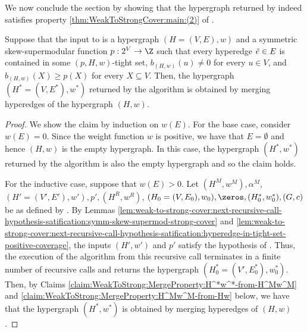 We now conclude the section by showing that the hypergraph returned by  indeed satisfies property \ref{thm:WeakToStrongCover:main:(2)} of .

\begin{lemma}\label{lem:weak-to-strong:correctness:main:hyperedge-merge}
    Suppose that the input to  is a hypergraph $(H = (V, E), w)$ and a symmetric skew-supermodular function $p:2^V\rightarrow \Z$ %
such that every hyperedge $\Tilde{e} \in E$ is contained in some $(p, H, w)$-tight set, $b_{(H,w)}(u) \not = 0$ for every $u \in V$, and $b_{(H,w)}(X) \geq p(X)$ for every $X \subseteq V$. 
    Then, the hypergraph $(H^* = (V, E^*), w^*)$ returned by the algorithm is obtained by merging hyperedges of the hypergraph $(H, w)$.
\end{lemma}
\begin{proof}
     We show the claim by induction on $w(E)$. For the base case, consider $w(E) = 0$. Since the weight function $w$ is positive, we have that $E = \emptyset$ and hence $(H, w)$ is the empty hypergraph. In this case, the hypergraph $(H^*, w^*)$ returned by the algorithm is also the empty hypergraph and so the claim holds. 

    For the inductive case, suppose that $w(E) > 0$. Let $(H^M, w^M), \alpha^M$, $(H' = (V', E'), w'), p',(H^R, w^R)$, $(H_0 = (V, E_0), w_0), \zeros, (H^*_0, w^*_0), (G, c)$ be as defined by . By Lemmas \ref{lem:weak-to-strong-cover:next-recursive-call-hypothesis-satification:symm-skew-supermod-strong-cover} and \ref{lem:weak-to-strong-cover:next-recursive-call-hypothesis-satification:hyperedge-in-tight-set-positive-coverage}, the inputs $(H',w')$ and $p'$ satisfy the hypothesis of . 
    Thus, the execution of the algorithm from this recursive call terminates in a finite number of recursive calls and returns the hypergraph $(H_0^* = (V', E_0^*), w_0^*)$. 
    Then, by Claims \ref{claim:WeakToStrong:MergeProperty:H^*w^*-from-H^Mw^M} and \ref{claim:WeakToStrong:MergeProperty:H^Mw^M-from-Hw} below, we have that the hypergraph $(H^*, w^*)$ is obtained by merging hyperedges of $(H, w)$.
    \end{proof}
